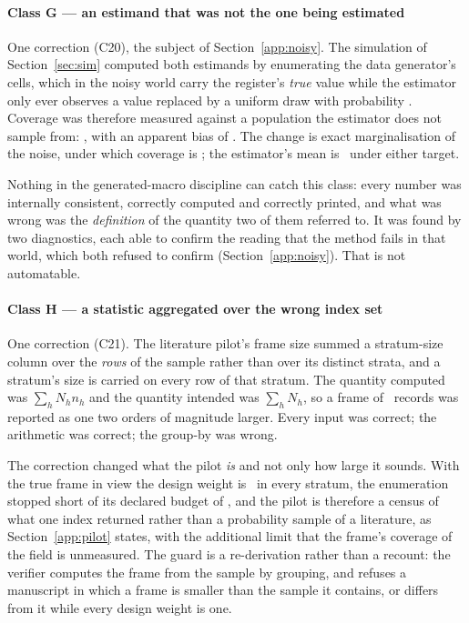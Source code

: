 \paragraph{Class G --- an estimand that was not the one being estimated}
One correction (C20), the subject of Section~\ref{app:noisy}. The simulation
of Section~\ref{sec:sim} computed both estimands by enumerating the data
generator's cells, which in the noisy world carry the register's \emph{true}
value while the estimator only ever observes a value replaced by a uniform
draw with probability \simNoiseRate. Coverage was therefore measured against
a population the estimator does not sample from: \coverageNoisyBefore, with
an apparent bias of \biasNoisyBefore. The change is exact marginalisation of
the noise, under which coverage is \coverageNoisyAfter; the estimator's mean
is \meanNoisyEstimate\ under either target.

Nothing in the generated-macro discipline can catch this class: every number
was internally consistent, correctly computed and correctly printed, and what
was wrong was the \emph{definition} of the quantity two of them referred to.
It was found by two diagnostics, each able to confirm the reading that the
method fails in that world, which both refused to confirm
(Section~\ref{app:noisy}). That is not automatable.

\paragraph{Class H --- a statistic aggregated over the wrong index set}
One correction (C21). The literature pilot's frame size summed a stratum-size
column over the \emph{rows} of the sample rather than over its distinct
strata, and a stratum's size is carried on every row of that stratum. The
quantity computed was $\sum_h N_h n_h$ and the quantity intended was
$\sum_h N_h$, so a frame of \nAuditFrame\ records was reported as one two
orders of magnitude larger. Every input was correct; the arithmetic was
correct; the group-by was wrong.

The correction changed what the pilot \emph{is} and not only how large it
sounds. With the true frame in view the design weight is \auditMaxWeight\ in
every stratum, the enumeration stopped short of its declared budget of
\nAuditTarget, and the pilot is therefore a census of what one index returned
rather than a probability sample of a literature, as Section~\ref{app:pilot}
states, with the additional limit that the frame's coverage of the field is
unmeasured. The guard is a re-derivation rather than a recount: the verifier
computes the frame from the sample by grouping, and refuses a manuscript in
which a frame is smaller than the sample it contains, or differs from it while
every design weight is one.

